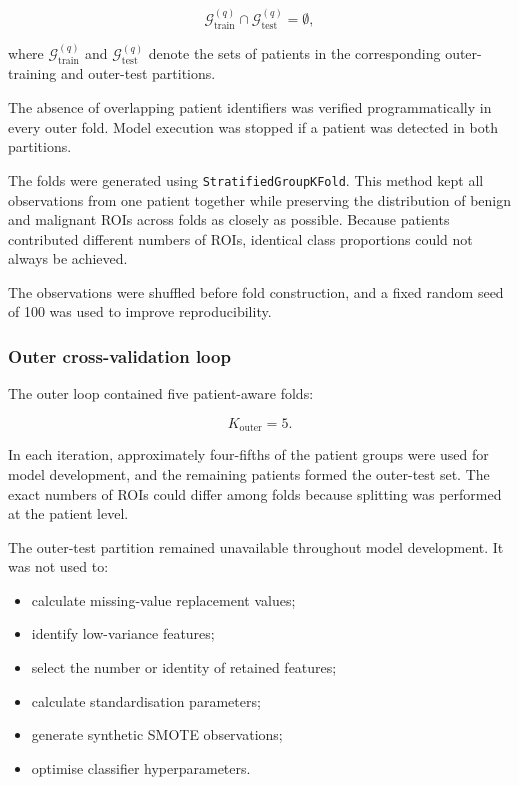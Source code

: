 \documentclass[12pt,twocolumn]{article}
\begin{document}
\begin{equation}
\mathcal{G}^{(q)}_{\mathrm{train}}
\cap
\mathcal{G}^{(q)}_{\mathrm{test}}
=
\emptyset,
\label{eq:patient_group_separation}
\end{equation}

where \(\mathcal{G}^{(q)}_{\mathrm{train}}\) and
\(\mathcal{G}^{(q)}_{\mathrm{test}}\) denote the sets of patients in
the corresponding outer-training and outer-test partitions.

The absence of overlapping patient identifiers was verified
programmatically in every outer fold. Model execution was stopped if a
patient was detected in both partitions.

The folds were generated using
\texttt{StratifiedGroupKFold}. This method kept all observations from
one patient together while preserving the distribution of benign and
malignant ROIs across folds as closely as possible. Because patients
contributed different numbers of ROIs, identical class proportions
could not always be achieved.

The observations were shuffled before fold construction, and a fixed
random seed of 100 was used to improve reproducibility.

\subsubsection{Outer cross-validation loop}
\label{subsubsec:outer_cv}

The outer loop contained five patient-aware folds:

\begin{equation}
K_{\mathrm{outer}}=5.
\label{eq:outer_folds}
\end{equation}

In each iteration, approximately four-fifths of the patient groups were
used for model development, and the remaining patients formed the
outer-test set. The exact numbers of ROIs could differ among folds
because splitting was performed at the patient level.

The outer-test partition remained unavailable throughout model
development. It was not used to:

\begin{itemize}
    \item calculate missing-value replacement values;
    \item identify low-variance features;
    \item select the number or identity of retained features;
    \item calculate standardisation parameters;
    \item generate synthetic SMOTE observations;
    \item optimise classifier hyperparameters.
\end{itemize}
\end{document}
